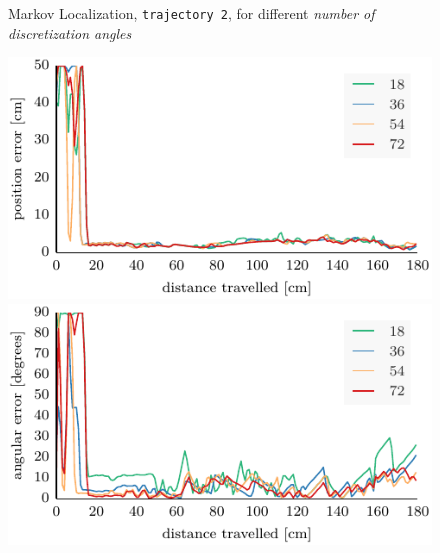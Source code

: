 \documentclass[letterpaper, 10pt, conference]{ieeeconf}
\begin{document}
\begin{figure}
\vspace{.3em}

\begin{center}
Markov Localization, \texttt{trajectory~2}, for different \emph{number of discretization angles}
\end{center}
\includegraphics{ml-whole_random_2-xy}\hfill
\includegraphics{ml-whole_random_2-theta}

\vspace{.3em}


\end{figure}
\end{document}
